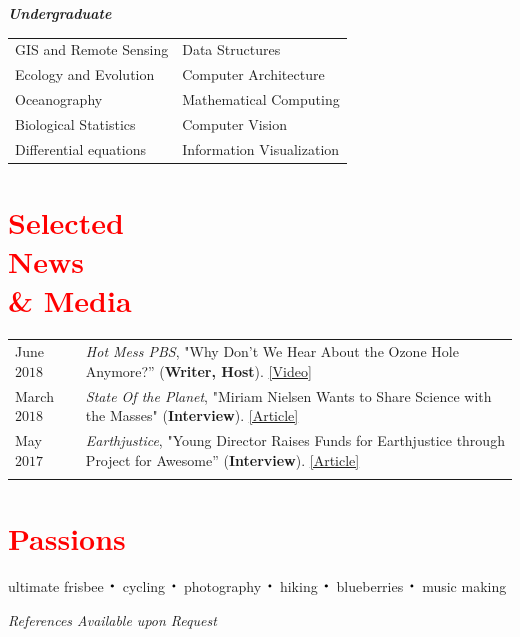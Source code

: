 \documentclass[margin, line]{res}
\newcommand*{\bigDot}{\raisebox{-0.25ex}{\scalebox{2.1}{$\cdot$}}}
\begin{document}
\begin{resume}
\textit{\textbf{Undergraduate}}
\vspace*{0.05in}\\
\begin{tabular}{@{}p{2.5in}p{4in}}
GIS and Remote Sensing & Data Structures \\
Ecology and Evolution & Computer Architecture \\
Oceanography & Mathematical Computing \\
Biological Statistics & Computer Vision \\
Differential equations & Information Visualization \\
\end{tabular}


\section{\sc \textcolor{Red}{\large{Selected  \\News \\ \& Media}}}
\vspace*{0.04in}
\begin{tabular}{@{}p{1in}p{4in}}
June $2018$ & \textit{Hot Mess PBS}, "Why Don’t We Hear About the Ozone Hole Anymore?'' (\textbf{Writer, Host}). \href{https://www.youtube.com/watch?v=mQpa_NYXUGI}{[Video]}\\

March $2018$ & \textit{State Of the Planet}, "Miriam Nielsen Wants to Share Science with the Masses" (\textbf{Interview}). \href{https://blogs.ei.columbia.edu/2018/03/05/miriam-nielsen-science-communications/}{[Article]}\\

May $2017$ & \textit{Earthjustice}, "Young Director Raises Funds for Earthjustice through Project for Awesome'' (\textbf{Interview}). \href{http://earthjustice.org/blog/2017-may/director-raises-funds-for-earthjustice-through-project-for-awesome}{[Article]}\\


\\
\end{tabular}

\section{\sc \textcolor{Red}{\large{Passions}}}
ultimate frisbee $\bigDot$ cycling $\bigDot$ photography $\bigDot$ hiking $\bigDot$ blueberries $\bigDot$ music making


\vspace{0.21 in}

\vspace{0.3 in}
\centerline{\emph{References Available upon Request}}


\end{resume}
\end{document}
